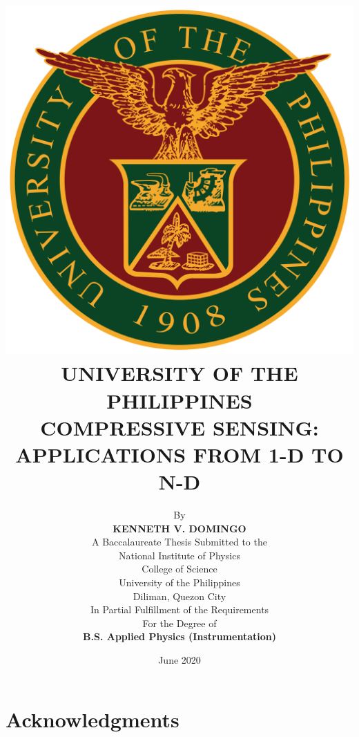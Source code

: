 \documentclass[12pt,oneside]{report}
\begin{document}

\title{
{\includegraphics[scale=0.15]{updlogo.png}} \\
{\normalsize UNIVERSITY OF THE PHILIPPINES} \\ \bigskip
{\bf COMPRESSIVE SENSING: APPLICATIONS FROM 1-D TO N-D}
}

\author{
{By} \\ \bigskip
{\bf KENNETH V. DOMINGO} \\ \bigskip
{\rm A Baccalaureate Thesis Submitted to the} \\
{\rm National Institute of Physics} \\
{\rm College of Science} \\
{\rm University of the Philippines} \\
{\rm Diliman, Quezon City} \\ \bigskip
{\rm In Partial Fulfillment of the Requirements} \\
{\rm For the Degree of} \\
{\bf B.S. Applied Physics (Instrumentation)}
}
\date{\normalsize June 2020}
\maketitle
\thispagestyle{titlestyle}

\chapter*{Acknowledgments}
\end{document}
